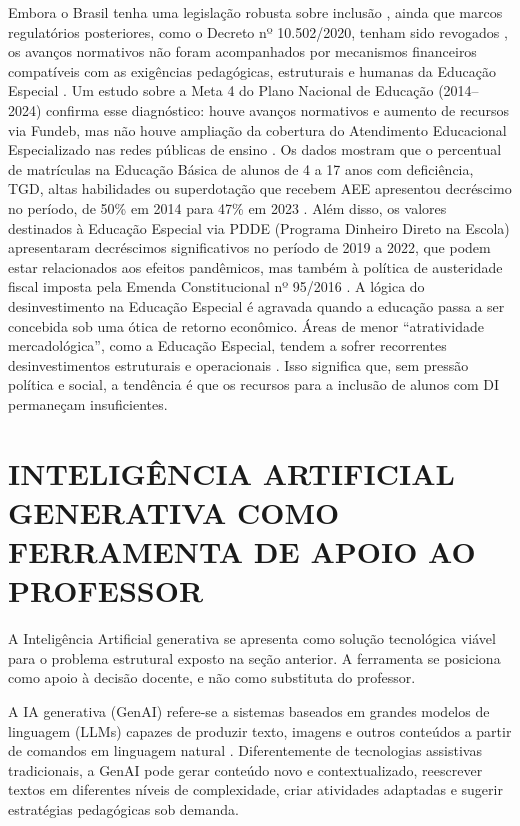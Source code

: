 Embora o Brasil tenha uma legislação robusta sobre inclusão \cite{brasil2015lbi}, ainda que marcos regulatórios posteriores, como o Decreto nº 10.502/2020, tenham sido revogados \cite{brasil2020pnee,brasil2023revogacao}, os avanços normativos não foram acompanhados por mecanismos financeiros compatíveis com as exigências pedagógicas, estruturais e humanas da Educação Especial \cite{lievore2025financiamento}. Um estudo sobre a Meta 4 do Plano Nacional de Educação (2014–2024) confirma esse diagnóstico: houve avanços normativos e aumento de recursos via Fundeb, mas não houve ampliação da cobertura do Atendimento Educacional Especializado nas redes públicas de ensino \cite{franca2025financiamento}. Os dados mostram que o percentual de matrículas na Educação Básica de alunos de 4 a 17 anos com deficiência, TGD, altas habilidades ou superdotação que recebem AEE apresentou decréscimo no período, de 50\% em 2014 para 47\% em 2023 \cite{franca2025financiamento}. Além disso, os valores destinados à Educação Especial via PDDE (Programa Dinheiro Direto na Escola) apresentaram decréscimos significativos no período de 2019 a 2022, que podem estar relacionados aos efeitos pandêmicos, mas também à política de austeridade fiscal imposta pela Emenda Constitucional nº 95/2016 \cite{franca2025financiamento}. A lógica do desinvestimento na Educação Especial é agravada quando a educação passa a ser concebida sob uma ótica de retorno econômico. Áreas de menor “atratividade mercadológica”, como a Educação Especial, tendem a sofrer recorrentes desinvestimentos estruturais e operacionais \cite{lievore2025financiamento}. Isso significa que, sem pressão política e social, a tendência é que os recursos para a inclusão de alunos com DI permaneçam insuficientes.

\section{INTELIGÊNCIA ARTIFICIAL GENERATIVA COMO FERRAMENTA
DE APOIO AO PROFESSOR}
\label{ia_generativa_apoio}

A Inteligência Artificial generativa se apresenta como solução tecnológica viável para o problema estrutural exposto na seção anterior. A ferramenta se posiciona como apoio à decisão docente, e não como substituta do professor.

A IA generativa (GenAI) refere-se a sistemas baseados em grandes modelos de linguagem (LLMs) capazes de produzir texto, imagens e outros conteúdos a partir de comandos em linguagem natural \cite{engaja2026}. Diferentemente de tecnologias assistivas tradicionais, a GenAI pode gerar conteúdo novo e contextualizado, reescrever textos em diferentes níveis de complexidade, criar atividades adaptadas e sugerir estratégias pedagógicas sob demanda.

